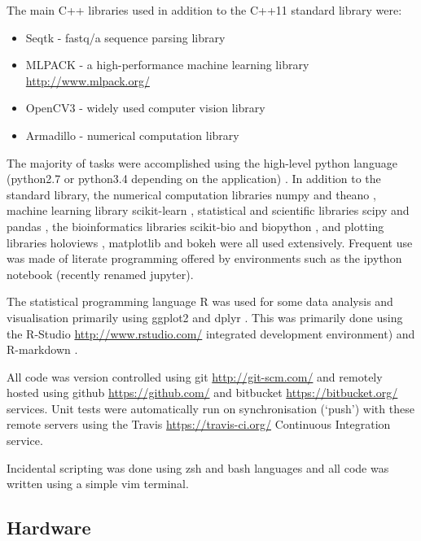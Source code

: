 The main C++ libraries used in addition to the C++11 standard library were:
\begin{itemize}
    \item Seqtk - fastq/a sequence parsing library \citep{SeqtkGitHub}
    \item MLPACK - a high-performance machine learning library \url{http://www.mlpack.org/} \citep{mlpack2013}
    \item OpenCV3 - widely used computer vision library \citep{opencv_library}
    \item Armadillo - numerical computation library \citep{Sanderson2010}
\end{itemize}

The majority of tasks were accomplished using the high-level python language (python2.7 or python3.4
depending on the application) \citep{}.  In addition to the standard library, the numerical
computation libraries numpy \citep{} and theano \citep{}, machine learning library scikit-learn \citep{},
statistical and scientific libraries scipy \citep{} and pandas \citep{}, the bioinformatics libraries
scikit-bio \citep{} and biopython \citep{}, and plotting libraries holoviews \citep{}, 
matplotlib \citep{} and bokeh \citep{} were all used extensively.
Frequent use was made of literate programming offered by environments such as the ipython notebook (recently
renamed jupyter).

The statistical programming language R \citep{RCoreTeam2015} was used for some data analysis
and visualisation primarily using ggplot2 \citep{Wickham2009} and dplyr \citep{Wickham2014}.
This was primarily done using the R-Studio \url{http://www.rstudio.com/} integrated development environment) and 
R-markdown \citep{Allaire2014}.

All code was version controlled using git \url{http://git-scm.com/} and remotely hosted using github \url{https://github.com/} and bitbucket \url{https://bitbucket.org/} 
services.  Unit tests were automatically run on synchronisation (`push') with these remote servers using 
the Travis \url{https://travis-ci.org/} Continuous Integration service.

Incidental scripting was done using zsh and bash languages and all code was written using a simple vim terminal.

\subsection{Hardware}

